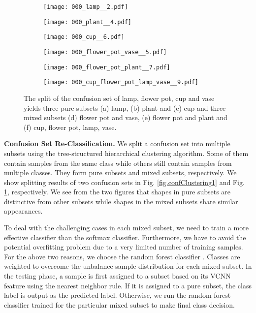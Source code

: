 \documentclass[preprint,12pt]{elsarticle}
\begin{document}
\begin{figure}[t]
\centering
\begin{subfigure}[b] {0.3\linewidth}
\centering
\texttt{[image: 000\_lamp\_\_2.pdf]}
\caption{ }
\end{subfigure}
\centering
\begin{subfigure}[b] {0.3\linewidth}
\centering
\texttt{[image: 000\_plant\_\_4.pdf]}
\caption{ }
\end{subfigure}
\centering
\begin{subfigure}[b] {0.3\linewidth}
\centering
\texttt{[image: 000\_cup\_\_6.pdf]}
\caption{ }
\end{subfigure}
\centering
\begin{subfigure}[b] {0.3\linewidth}
\centering
\texttt{[image: 000\_flower\_pot\_vase\_\_5.pdf]}
\caption{ }
\end{subfigure}
\centering
\begin{subfigure}[b] {0.3\linewidth}
\centering
\texttt{[image: 000\_flower\_pot\_plant\_\_7.pdf]}
\caption{ }
\end{subfigure}
\centering
\begin{subfigure}[b] {0.3\linewidth}
\centering
\texttt{[image: 000\_cup\_flower\_pot\_lamp\_vase\_\_9.pdf]}
\caption{ }
\end{subfigure}
\caption{The split of the confusion set of lamp, flower pot, cup and
vase yields three pure subsets (a) lamp, (b) plant and (c) cup and three
mixed subsets (d) flower pot and vase, (e) flower pot and plant and (f)
cup, flower pot, lamp, vase.}\label{fig.confClustering2}
\end{figure}

{\bf Confusion Set Re-Classification.} We split a confusion set into
multiple subsets using the tree-structured hierarchical clustering
algorithm. Some of them contain samples from the same class while others
still contain samples from multiple classes. They form pure subsets and mixed subsets, respectively. We show splitting results
of two confusion sets in Fig.  \ref{fig.confClustering1} and Fig.
\ref{fig.confClustering2}, respectively. We see from the two figures
that shapes in pure subsets are distinctive from other subsets while
shapes in the mixed subsets share similar appearances. 

To deal with the challenging cases in each mixed subset, we need to
train a more effective classifier than the softmax classifier.
Furthermore, we have to avoid the potential overfitting problem due to a
very limited number of training samples.  For the above two reasons, we
choose the random forest classifier \cite{breiman2001random}. Classes
are weighted to overcome the unbalance sample distribution for each
mixed subset. In the testing phase, a sample is first assigned to a
subset based on its VCNN feature using the nearest neighbor rule. If it
is assigned to a pure subset, the class label is output as the predicted
label. Otherwise, we run the random forest classifier trained for the
particular mixed subset to make final class decision. 
\end{document}
